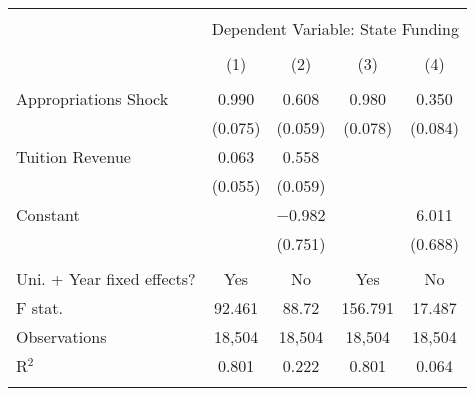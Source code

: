 
\begin{tabular}{@{\extracolsep{5pt}}lcccc} 
\\[-1.8ex]\hline 
\hline \\[-1.8ex] 
 & \multicolumn{4}{c}{Dependent Variable: State Funding} \\ 
\cline{2-5} 
\\[-1.8ex] & (1) & (2) & (3) & (4)\\ 
\hline \\[-1.8ex] 
 Appropriations Shock & 0.990 & 0.608 & 0.980 & 0.350 \\ 
  & (0.075) & (0.059) & (0.078) & (0.084) \\ 
  Tuition Revenue & 0.063 & 0.558 &  &  \\ 
  & (0.055) & (0.059) &  &  \\ 
  Constant &  & $-$0.982 &  & 6.011 \\ 
  &  & (0.751) &  & (0.688) \\ 
 \hline \\[-1.8ex] 
Uni. + Year fixed effects? & Yes & No & Yes & No \\ 
F stat. & 92.461 & 88.72 & 156.791 & 17.487 \\ 
Observations & 18,504 & 18,504 & 18,504 & 18,504 \\ 
R$^{2}$ & 0.801 & 0.222 & 0.801 & 0.064 \\ 
\hline 
\hline \\[-1.8ex] 
\end{tabular} 
